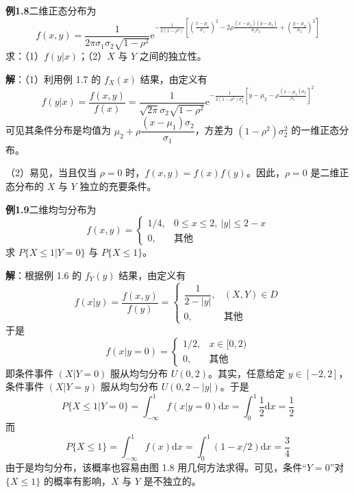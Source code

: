 \documentclass[11pt,openany,UTF8]{ctexbook}
\newcommand{\dif}{\mathrm{d}}                      %
\newcommand{\eu}{\mathrm{e}}                       %
\begin{document}
\begin{examplebox}
\textbf{例1.8}\quad 二维正态分布为
\[
f(x,y)=\frac{1}{2\pi\sigma_1\sigma_2\sqrt{1-\rho^2}}
\eu^{-\frac{1}{2(1-\rho^2)}\left[\left(\frac{x-\mu_1}{\sigma_1}\right)^2
-2\rho\frac{(x-\mu_1)(y-\mu_2)}{\sigma_1\sigma_2}
+\left(\frac{y-\mu_2}{\sigma_2}\right)^2\right]}
\]
求\nobreak：（1\nobreak）$f(y|x)$\nobreak；（2\nobreak）$X$ 与 $Y$ 之间的独立性\nobreak。

\textbf{解}\nobreak：（1\nobreak）利用例 1.7 的 $f_X(x)$ 结果\nobreak，由定义有
\begin{equation}
f(y|x)=\frac{f(x,y)}{f(x)}
=\frac{1}{\sqrt{2\pi}\sigma_2\sqrt{1-\rho^2}}
\eu^{-\frac{1}{2(1-\rho^2)\sigma_2^2}\left[y-\mu_2-\rho\frac{(x-\mu_1)\sigma_2}{\sigma_1}\right]^2}
\label{eq:1.25}
\end{equation}
可见其条件分布是均值为 $\mu_2+\rho\dfrac{(x-\mu_1)\sigma_2}{\sigma_1}$\nobreak，方差为 $(1-\rho^2)\sigma_2^2$ 的一维正态分布\nobreak。

（2\nobreak）易见\nobreak，当且仅当 $\rho=0$ 时\nobreak，$f(x,y)=f(x)f(y)$\nobreak。因此\nobreak，$\rho=0$ 是二维正态分布的 $X$ 与 $Y$ 独立的充要条件\nobreak。
\end{examplebox}

\begin{examplebox}
\textbf{例1.9}\quad 二维均匀分布为
\[
f(x,y)=
\begin{cases}
1/4, & 0\leqslant x\leqslant 2,\ \lvert y\rvert\leqslant 2-x\\
0, & \text{其他}
\end{cases}
\]
求 $P\{X\leqslant 1|Y=0\}$ 与 $P\{X\leqslant 1\}$\nobreak。

\textbf{解}\nobreak：根据例 1.6 的 $f_Y(y)$ 结果\nobreak，由定义有
\[
f(x|y)=\frac{f(x,y)}{f(y)}=
\begin{cases}
\dfrac{1}{2-\lvert y\rvert}, & (X,Y)\in D\\[2mm]
0, & \text{其他}
\end{cases}
\]
于是
\[
f(x|y=0)=
\begin{cases}
1/2, & x\in[0,2)\\
0, & \text{其他}
\end{cases}
\]
即条件事件 $(X|Y=0)$ 服从均匀分布 $U(0,2)$\nobreak。其实\nobreak，任意给定 $y\in[-2,2]$\nobreak，条件事件 $(X|Y=y)$ 服从均匀分布 $U(0,2-\lvert y\rvert)$\nobreak。于是
\[
P\{X\leqslant 1|Y=0\}=\int_{-\infty}^{1}f(x|y=0)\dif x=\int_{0}^{1}\frac{1}{2}\dif x=\frac{1}{2}
\]
而
\[
P\{X\leqslant 1\}=\int_{-\infty}^{1}f(x)\dif x=\int_{0}^{1}(1-x/2)\dif x=\frac{3}{4}
\]
由于是均匀分布\nobreak，该概率也容易由图 1.8 用几何方法求得\nobreak。可见\nobreak，条件“$Y=0$”对 $\{X\leqslant 1\}$ 的概率有影响\nobreak，$X$ 与 $Y$ 是不独立的\nobreak。
\end{examplebox}
\end{document}

